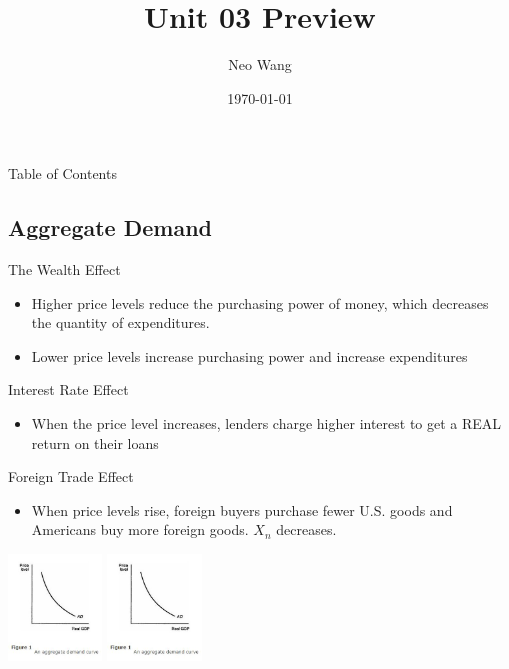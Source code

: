 \documentclass[8pt]{beamer}
\title{Unit 03 Preview}
\date{\today}
\author{Neo Wang}
\institute{Westlake High School}
\begin{document}
  \maketitle
  \begin{frame}{Table of Contents}
	\tableofcontents
  \end{frame}
  \begin{frame}
	\section{Aggregate Demand}
	The Wealth Effect
	\begin{itemize}
		\item \tiny Higher price levels reduce the purchasing power of money, which
		decreases the quantity of expenditures.
		\item \tiny Lower price levels increase purchasing power and increase
		expenditures
	\end{itemize}
	Interest Rate Effect
	\begin{itemize}
		\item \tiny When the price level increases, lenders charge higher interest to
		get a REAL return on their loans
	\end{itemize}
	Foreign Trade Effect
	\begin{itemize}
		\item \tiny When price levels rise, foreign buyers purchase fewer U.S. 
		goods and Americans buy more foreign goods. $X_n$ decreases.
	\end{itemize}
	\includegraphics[width=2.5cm]{2021-10-12-11-50-24.png}
	\includegraphics[width=2.5cm]{2021-10-12-11-59-30.png}
  \end{frame}
\end{document}
